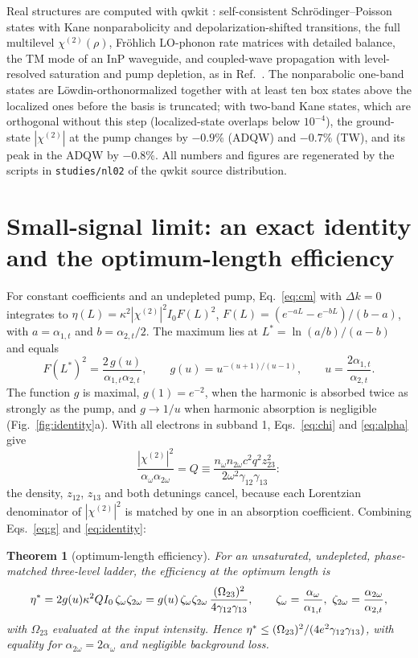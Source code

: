 \documentclass[11pt]{article}
\newcommand{\chitwo}{\chi^{(2)}}
\newcommand{\aw}{\alpha_{\omega}}
\newcommand{\aww}{\alpha_{2\omega}}
\let\hbar\relax\DeclareRobustCommand{\hbar}{{\mathchar'26\mkern-9mu h}}
\newtheorem{theorem}{Theorem}
\begin{document}
Real structures are computed with qwkit \cite{qwkit}: self-consistent Schr\"odinger--Poisson states with Kane nonparabolicity and depolarization-shifted transitions, the full multilevel $\chitwo(\rho)$, Fr\"ohlich LO-phonon rate matrices with detailed balance, the TM mode of an InP waveguide, and coupled-wave propagation with level-resolved saturation and pump depletion, as in Ref.~\cite{OwnbyN1}. The nonparabolic one-band states are L\"owdin-orthonormalized together with at least ten box states above the localized ones before the basis is truncated; with two-band Kane states, which are orthogonal without this step (localized-state overlaps below $10^{-4}$), the ground-state $|\chitwo|$ at the pump changes by $-0.9$\% (ADQW) and $-0.7$\% (TW), and its peak in the ADQW by $-0.8$\%. All numbers and figures are regenerated by the scripts in \texttt{studies/nl02} of the qwkit source distribution.

\section{Small-signal limit: an exact identity and the optimum-length efficiency}\label{sec:t1}
For constant coefficients and an undepleted pump, Eq.~\eqref{eq:cm} with $\Delta k=0$ integrates to $\eta(L)=\kappa^2|\chitwo|^2I_0F(L)^2$, $F(L)=(e^{-aL}-e^{-bL})/(b-a)$, with $a=\alpha_{1,t}$ and $b=\alpha_{2,t}/2$. The maximum lies at $L^*=\ln(a/b)/(a-b)$ and equals
\begin{equation}
F(L^*)^2=\frac{2\,g(u)}{\alpha_{1,t}\alpha_{2,t}},\qquad g(u)=u^{-(u+1)/(u-1)},\qquad u=\frac{2\alpha_{1,t}}{\alpha_{2,t}}.\label{eq:g}
\end{equation}
The function $g$ is maximal, $g(1)=e^{-2}$, when the harmonic is absorbed twice as strongly as the pump, and $g\to1/u$ when harmonic absorption is negligible (Fig.~\ref{fig:identity}a). With all electrons in subband 1, Eqs.~\eqref{eq:chi} and \eqref{eq:alpha} give
\begin{equation}
\frac{|\chitwo|^2}{\aw\aww}=Q\equiv\frac{n_\omega n_{2\omega}c^2q^2z_{23}^2}{2\omega^2\gamma_{12}\gamma_{13}}:\label{eq:identity}
\end{equation}
the density, $z_{12}$, $z_{13}$ and both detunings cancel, because each Lorentzian denominator of $|\chitwo|^2$ is matched by one in an absorption coefficient. Combining Eqs.~\eqref{eq:g} and \eqref{eq:identity}:

\begin{theorem}[optimum-length efficiency]
For an unsaturated, undepleted, phase-matched three-level ladder, the efficiency at the optimum length is
\begin{equation}
\eta^*=2g(u)\kappa^2QI_0\,\zeta_\omega\zeta_{2\omega}=g(u)\,\zeta_\omega\zeta_{2\omega}\,\frac{(\hbar\Omega_{23})^2}{4\gamma_{12}\gamma_{13}},\qquad\zeta_\omega=\frac{\aw}{\alpha_{1,t}},\ \zeta_{2\omega}=\frac{\aww}{\alpha_{2,t}},\label{eq:t1}
\end{equation}
with $\Omega_{23}$ evaluated at the input intensity. Hence $\eta^*\le(\hbar\Omega_{23})^2/(4e^2\gamma_{12}\gamma_{13})$, with equality for $\aww=2\aw$ and negligible background loss.
\end{theorem}
\end{document}
